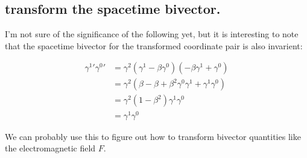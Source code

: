 \documentclass{article}      %
\begin{document}
\subsection{ transform the spacetime bivector. }

I'm not sure of the significance of the following yet, but it is interesting to note that the spacetime bivector for the transformed coordinate
pair is also invarient:

\begin{align*}
{\gamma^1}' {\gamma^0}'
&= \gamma^2 (\gamma^1 -\beta \gamma^0) (-\beta \gamma^1 + \gamma^0 ) \\
&= \gamma^2 (\beta -\beta +\beta^2 \gamma^0 \gamma^1 + \gamma^1 \gamma^0) \\
&= \gamma^2 (1-\beta^2) \gamma^1 \gamma^0 \\
&= \gamma^1 \gamma^0 
\end{align*}

We can probably use this to figure out how to transform bivector quantities like the electromagnetic field $F$.
\end{document}
